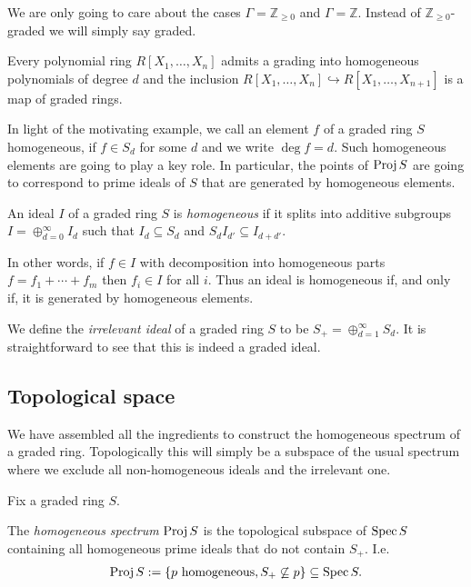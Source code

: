 \documentclass{article}
\begin{document}
We are only going to care about the cases $\Gamma=\mathbb{Z}_{\geq 0}$
and $\Gamma=\mathbb{Z}$. Instead of $\mathbb{Z}_{\geq 0}$-graded
we will simply say graded.

\begin{example}
  Every polynomial ring $R[X_1,\ldots,X_n]$ admits a grading into
  homogeneous polynomials of degree $d$ and the inclusion
  $R[X_1,\ldots,X_n] \hookrightarrow R[X_1,\ldots,X_{n+1}]$
  is a map of graded rings.
\end{example}

In light of the motivating example, we call an element
$f$ of a graded ring $S$ homogeneous, if $f\in S_d$ for some $d$
and we write $\deg f = d$.
Such homogeneous elements are going to play a key role. In particular,
the points of $\operatorname{Proj} S$ are going to correspond to prime ideals of $S$
that are generated by homogeneous elements.

\begin{definition}
  An ideal $I$ of a graded ring $S$ is \emph{homogeneous} if it splits into
  additive subgroups $I=\oplus_{d=0}^\infty I_d$ such that
  $I_d\subseteq S_d$ and $S_d I_{d'} \subseteq I_{d+d'}$.
\end{definition}

In other words, if $f\in I$ with decomposition into homogeneous parts
$f=f_1+\cdots + f_m$ then $f_i\in I$ for all $i$. Thus an ideal is
homogeneous if, and only if, it is generated by homogeneous elements.
\cite{boer1961}

\begin{example}
  We define the \emph{irrelevant ideal} of a graded ring $S$
  to be $S_+ = \oplus_{d=1}^\infty S_d$. It is straightforward to
  see that this is indeed a graded ideal.
\end{example}

\subsection{Topological space}

We have assembled all the ingredients to construct the homogeneous
spectrum of a graded ring. Topologically this will simply be a
subspace of the usual spectrum where we exclude all non-homogeneous
ideals and the irrelevant one.

Fix a graded ring $S$.

\begin{definition}
  The \emph{homogeneous spectrum} $\operatorname{Proj} S$
  is the topological subspace of $\operatorname{Spec} S$ containing all
  homogeneous prime ideals that do not contain $S_+$. I.e.
  \begin{align*}
    \operatorname{Proj} S := \left\lbrace{ \text{$p$ homogeneous}, S_+ \not\subseteq p }\right\rbrace \subseteq \operatorname{Spec} S.
  \end{align*}
\end{definition}
\end{document}
